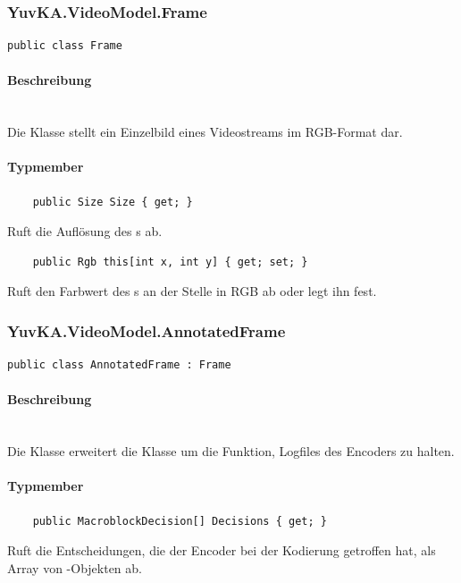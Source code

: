 \subsubsection{YuvKA.VideoModel.Frame}

\begin{verbatim}
public class Frame
\end{verbatim}

\paragraph{Beschreibung}~\\
Die Klasse  stellt ein Einzelbild eines Videostreams im RGB-Format dar.

\paragraph{Typmember}
\begin{itemize}

	\begin{verbatim}
	public Size Size { get; }
	\end{verbatim}
	Ruft die Auflösung des s ab.

	\begin{verbatim}
	public Rgb this[int x, int y] { get; set; }
	\end{verbatim}
	Ruft den Farbwert des s an der Stelle  in RGB ab oder legt ihn fest.

\end{itemize}

\subsubsection{YuvKA.VideoModel.AnnotatedFrame}

\begin{verbatim}
public class AnnotatedFrame : Frame
\end{verbatim}

\paragraph{Beschreibung}~\\
Die Klasse  erweitert die Klasse  um die Funktion, Logfiles des Encoders zu halten.

\paragraph{Typmember}
\begin{itemize}

	\begin{verbatim}
	public MacroblockDecision[] Decisions { get; }
	\end{verbatim}
	Ruft die Entscheidungen, die der Encoder bei der Kodierung getroffen hat, als Array von -Objekten ab.

\end{itemize}

